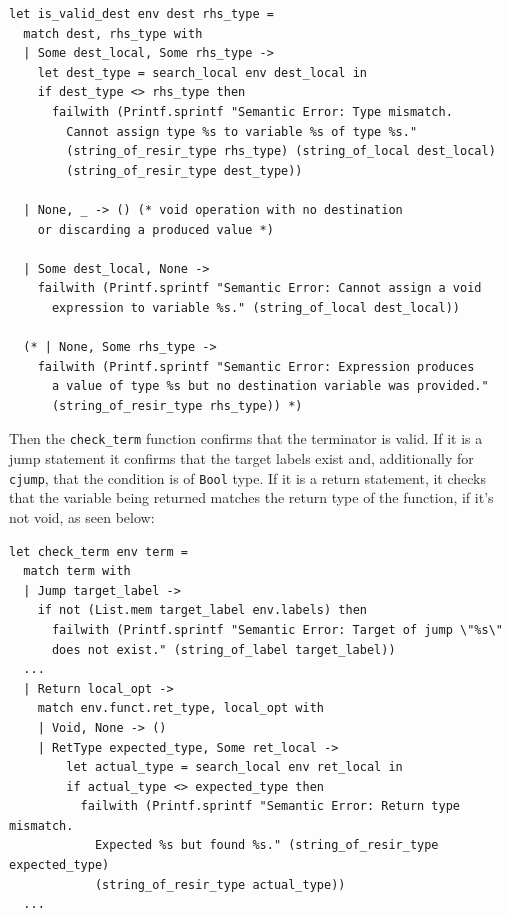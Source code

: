 \documentclass[11pt, a4paper]{article}
\begin{document}
\medskip

\begin{lstlisting}[language={[Objective]Caml}]
let is_valid_dest env dest rhs_type =
  match dest, rhs_type with
  | Some dest_local, Some rhs_type ->
    let dest_type = search_local env dest_local in
    if dest_type <> rhs_type then
      failwith (Printf.sprintf "Semantic Error: Type mismatch. 
        Cannot assign type %s to variable %s of type %s." 
        (string_of_resir_type rhs_type) (string_of_local dest_local) 
        (string_of_resir_type dest_type))

  | None, _ -> () (* void operation with no destination 
    or discarding a produced value *)

  | Some dest_local, None ->
    failwith (Printf.sprintf "Semantic Error: Cannot assign a void 
      expression to variable %s." (string_of_local dest_local))

  (* | None, Some rhs_type ->
    failwith (Printf.sprintf "Semantic Error: Expression produces 
      a value of type %s but no destination variable was provided." 
      (string_of_resir_type rhs_type)) *)
\end{lstlisting}

\medskip

Then the \texttt{check\_term} function confirms that the terminator is valid. If it is a jump statement it confirms that the target labels exist and, additionally for \texttt{cjump}, that the condition is of \texttt{Bool} type. 
If it is a return statement, it checks that the variable being returned matches the return type of the function, if it's not void, as seen below:

\medskip

\begin{lstlisting}[language={[Objective]Caml}]
let check_term env term =
  match term with
  | Jump target_label ->
    if not (List.mem target_label env.labels) then
      failwith (Printf.sprintf "Semantic Error: Target of jump \"%s\" 
      does not exist." (string_of_label target_label))
  ...
  | Return local_opt ->
    match env.funct.ret_type, local_opt with
    | Void, None -> ()
    | RetType expected_type, Some ret_local ->
        let actual_type = search_local env ret_local in
        if actual_type <> expected_type then
          failwith (Printf.sprintf "Semantic Error: Return type mismatch. 
            Expected %s but found %s." (string_of_resir_type expected_type) 
            (string_of_resir_type actual_type))
  ...
\end{lstlisting}
\end{document}
